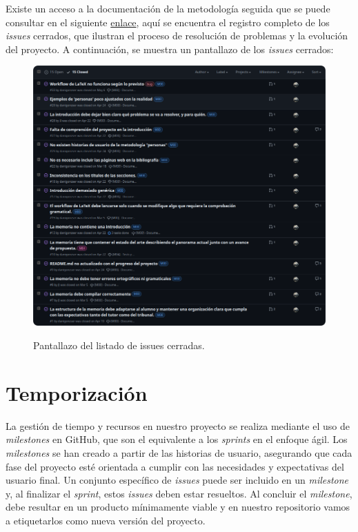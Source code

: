 Existe un acceso a la documentación de la metodología seguida que se puede consultar en el siguiente \href{https://github.com/danigonzser/proyecto-tfg/issues?q=is%3Aissue+is%3Aclosed}{enlace}, aquí se encuentra el registro completo de los \textit{issues} cerrados, que ilustran el proceso de resolución de problemas y la evolución del proyecto. A continuación, se muestra un pantallazo de los \textit{issues} cerrados:

\begin{figure}[H]
    \caption{Pantallazo del listado de issues cerradas.}
    \centering
    \vspace*{0.5cm}
    \includegraphics[scale=0.2]{figuras/listado_issues_cerradas.png}\label{fig:figuras/listado_issues_cerradas.png}
\end{figure}

\section{Temporización}

La gestión de tiempo y recursos en nuestro proyecto se realiza mediante el uso de \textit{milestones} en GitHub, que son el equivalente a los \textit{sprints} en el enfoque ágil. Los \textit{milestones} se han creado a partir de las historias de usuario, asegurando que cada fase del proyecto esté orientada a cumplir con las necesidades y expectativas del usuario final. Un conjunto específico de \textit{issues} puede ser incluido en un \textit{milestone} y, al finalizar el \textit{sprint}, estos \textit{issues} deben estar resueltos. Al concluir el \textit{milestone}, debe resultar en un producto mínimamente viable y en nuestro repositorio vamos a etiquetarlos como nueva versión del proyecto.

